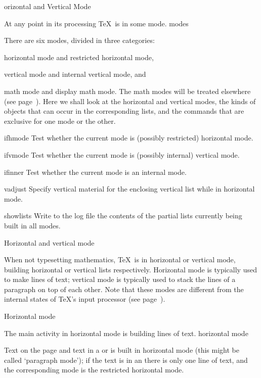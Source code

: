 \subject[hvmode]  Horizontal and \nl Vertical Mode


At any point in its processing \TeX\ is in some mode.
\term modes\par
There are six modes, divided in three categories:
\enumerate \item horizontal mode and restricted horizontal
mode, \item vertical mode and internal vertical mode, and
\item math mode and display math mode.\enumeratestop
The math modes will be treated elsewhere (see page~).
Here we shall look
at the horizontal and vertical modes, the kinds of objects
that can occur in the corresponding lists, and the
commands that are exclusive for one mode or the other. 


\invent
\item ifhmode 
      Test whether the current mode is (possibly restricted) horizontal mode.

\item ifvmode 
      Test whether the current mode is (possibly internal) vertical mode.

\item ifinner 
      Test whether the current mode is an internal mode.

\item vadjust 
      Specify vertical material for the enclosing vertical list
      while in horizontal mode.

\item showlists 
      Write to the log file the contents of the partial lists 
      currently being built in all modes.
\>

\point Horizontal and vertical mode

When not typesetting mathematics, \TeX\ is in horizontal
or vertical mode, building horizontal or vertical lists
respectively. Horizontal mode is typically used to
make lines of text; vertical mode is typically used
to stack the lines of a paragraph on top of each other.
Note that
these modes
are different from the internal states of \TeX's input processor
(see page~).

\spoint Horizontal mode

The main activity in horizontal mode is building lines of text.
\term horizontal mode\par
Text on the page and text in a  or  is built in
horizontal mode (this might be called `paragraph mode');
if the text is in an  there is only one line
of text, and the corresponding mode is the restricted
\awp
horizontal mode.

